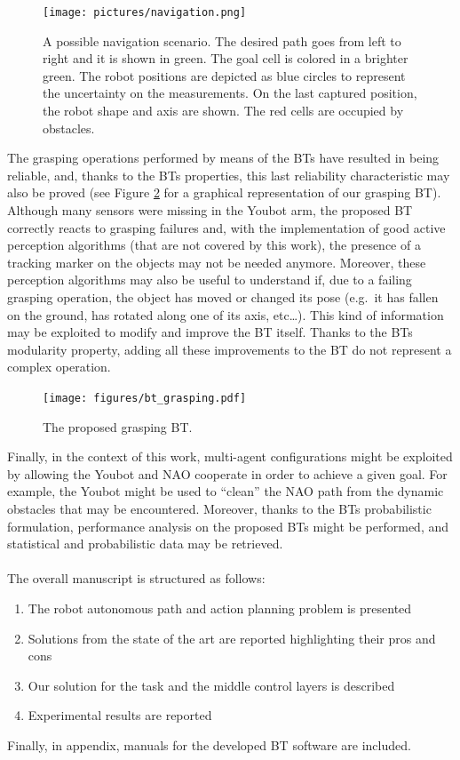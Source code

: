 \documentclass[12pt, a4paper]{article}
\begin{document}
\begin{figure}[h!]
\centering
\texttt{[image: pictures/navigation.png]}
\caption{A possible navigation scenario. The desired path goes from left to right and it is shown in green. The goal cell is colored in a brighter green. The robot positions are depicted as blue circles to represent the uncertainty on the measurements. On the last captured position, the robot shape and axis are shown. The red cells are occupied by obstacles.}
\label{fig:navigation}
\end{figure}
The grasping operations performed by means of the BTs have resulted in being reliable, and, thanks to the BTs properties, this last reliability characteristic may also be proved (see Figure \ref{fig:grasping} for a graphical representation of our grasping BT). Although many sensors were missing in the Youbot arm, the proposed BT correctly reacts to grasping failures and, with the implementation of good active perception algorithms (that are not covered by this work), the presence of a tracking marker on the objects may not be needed anymore. Moreover, these perception algorithms may also be useful to understand if, due to a failing grasping operation, the object has moved or changed its pose (e.g.\ it has fallen on the ground, has rotated along one of its axis, etc\dots). This kind of information may be exploited to modify and improve the BT itself. Thanks to the BTs modularity property, adding all these improvements to the BT do not represent a complex operation.\par
\begin{figure}[h!]
\centering
\texttt{[image: figures/bt\_grasping.pdf]}
\caption{The proposed grasping BT.}
\label{fig:grasping}
\end{figure}
Finally, in the context of this work, multi-agent configurations might be exploited by allowing the Youbot and NAO cooperate in order to achieve a given goal. For example, the Youbot might be used to ``clean'' the NAO path from the dynamic obstacles that may be encountered. Moreover, thanks to the BTs probabilistic formulation, performance analysis on the proposed BTs might be performed, and statistical and probabilistic data may be retrieved. \\ \\
The overall manuscript is structured as follows:
\begin{enumerate}
\item The robot autonomous path and action planning problem is presented
\item Solutions from the state of the art are reported highlighting their pros and cons
\item Our solution for the task and the middle control layers is described
\item Experimental results are reported
\end{enumerate}
Finally, in appendix, manuals for the developed BT software are included.\\
\end{document}
